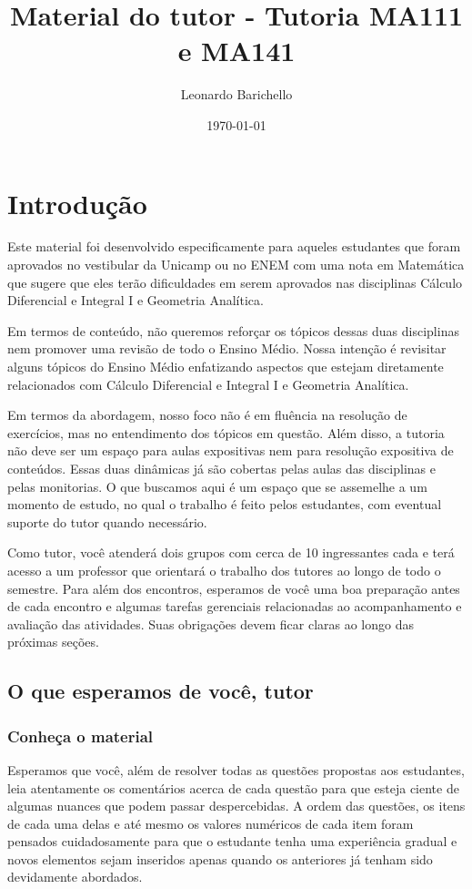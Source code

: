 \documentclass[openany]{book}
\title{Material do tutor - Tutoria MA111 e MA141}
\author{Leonardo Barichello}
\date{\today}
\begin{document}
 
\maketitle

\chapter{Introdução}

Este material foi desenvolvido especificamente para aqueles estudantes que foram aprovados no vestibular da Unicamp ou no ENEM com uma nota em Matemática que sugere que eles terão dificuldades em serem aprovados nas disciplinas Cálculo Diferencial e Integral I e Geometria Analítica.

Em termos de conteúdo, não queremos reforçar os tópicos dessas duas disciplinas nem promover uma revisão de todo o Ensino Médio. Nossa intenção é revisitar alguns tópicos do Ensino Médio enfatizando aspectos que estejam diretamente relacionados com Cálculo Diferencial e Integral I e Geometria Analítica.

Em termos da abordagem, nosso foco não é em fluência na resolução de exercícios, mas no entendimento dos tópicos em questão. Além disso, a tutoria não deve ser um espaço para aulas expositivas nem para resolução expositiva de conteúdos. Essas duas dinâmicas já são cobertas pelas aulas das disciplinas e pelas monitorias. O que buscamos aqui é um espaço que se assemelhe a um momento de estudo, no qual o trabalho é feito pelos estudantes, com eventual suporte do tutor quando necessário.

Como tutor, você atenderá dois grupos com cerca de 10 ingressantes cada e terá acesso a um professor que orientará o trabalho dos tutores ao longo de todo o semestre. Para além dos encontros, esperamos de você uma boa preparação antes de cada encontro e algumas tarefas gerenciais relacionadas ao acompanhamento e avaliação das atividades. Suas obrigações devem ficar claras ao longo das próximas seções.

\section{O que esperamos de você, tutor}

\subsection{Conheça o material}

Esperamos que você, além de resolver todas as questões propostas aos estudantes, leia atentamente os comentários acerca de cada questão para que esteja ciente de algumas nuances que podem passar despercebidas. A ordem das questões, os itens de cada uma delas e até mesmo os valores numéricos de cada item foram pensados cuidadosamente para que o estudante tenha uma experiência gradual e novos elementos sejam inseridos apenas quando os anteriores já tenham sido devidamente abordados.
\end{document}
